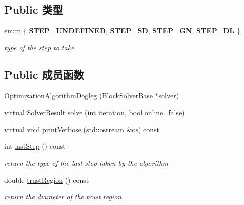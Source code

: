 \subsection*{Public 类型}
\begin{DoxyCompactItemize}
\item 
enum \{ {\bfseries S\-T\-E\-P\-\_\-\-U\-N\-D\-E\-F\-I\-N\-E\-D}, 
{\bfseries S\-T\-E\-P\-\_\-\-S\-D}, 
{\bfseries S\-T\-E\-P\-\_\-\-G\-N}, 
{\bfseries S\-T\-E\-P\-\_\-\-D\-L}
 \}
\begin{DoxyCompactList}\small\item\em type of the step to take \end{DoxyCompactList}\end{DoxyCompactItemize}
\subsection*{Public 成员函数}
\begin{DoxyCompactItemize}
\item 
\hyperlink{classg2o_1_1OptimizationAlgorithmDogleg_ab332f8fb049d1a1fecba18105083052a}{Optimization\-Algorithm\-Dogleg} (\hyperlink{classg2o_1_1BlockSolverBase}{Block\-Solver\-Base} $\ast$\hyperlink{classg2o_1_1OptimizationAlgorithmWithHessian_a85473a4073c76b1a52cf9cf175e31c45}{solver})
\item 
virtual Solver\-Result \hyperlink{classg2o_1_1OptimizationAlgorithmDogleg_ace62fd809c18655bd7ff104285748610}{solve} (int iteration, bool online=false)
\item 
virtual void \hyperlink{classg2o_1_1OptimizationAlgorithmDogleg_a9bed238c5d36c094ca10103bb1c3979e}{print\-Verbose} (std\-::ostream \&os) const 
\item 
\hypertarget{classg2o_1_1OptimizationAlgorithmDogleg_a53a17375bcc00da1e56ad6582dff5d7b}{int \hyperlink{classg2o_1_1OptimizationAlgorithmDogleg_a53a17375bcc00da1e56ad6582dff5d7b}{last\-Step} () const }\label{classg2o_1_1OptimizationAlgorithmDogleg_a53a17375bcc00da1e56ad6582dff5d7b}

\begin{DoxyCompactList}\small\item\em return the type of the last step taken by the algorithm \end{DoxyCompactList}\item 
\hypertarget{classg2o_1_1OptimizationAlgorithmDogleg_a6cf67489a9b88d02ab74d6125df35f4b}{double \hyperlink{classg2o_1_1OptimizationAlgorithmDogleg_a6cf67489a9b88d02ab74d6125df35f4b}{trust\-Region} () const }\label{classg2o_1_1OptimizationAlgorithmDogleg_a6cf67489a9b88d02ab74d6125df35f4b}

\begin{DoxyCompactList}\small\item\em return the diameter of the trust region \end{DoxyCompactList}\end{DoxyCompactItemize}
